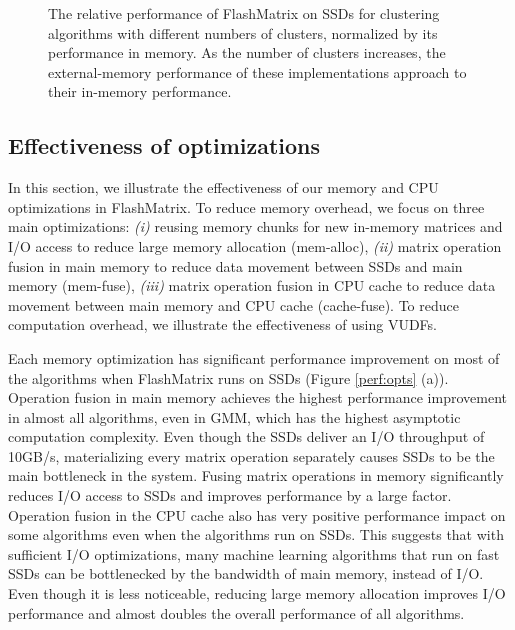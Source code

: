\begin{figure}
	\begin{center}
		\footnotesize
		\vspace{-15pt}
		
		\vspace{-10pt}
		\caption{The relative performance of FlashMatrix on SSDs for
			clustering algorithms with different numbers of clusters, normalized
			by its performance in memory. As the number of clusters increases,
			the external-memory performance of these implementations approach
			to their in-memory performance.}
		\label{perf:clust}
	\end{center}
\end{figure}

\subsection{Effectiveness of optimizations}

In this section, we illustrate the effectiveness of our memory and CPU
optimizations in FlashMatrix. To reduce memory overhead, we focus on three
main optimizations: \textit{(i)} reusing memory chunks for new in-memory
matrices and I/O access to reduce large memory allocation (mem-alloc),
\textit{(ii)} matrix operation fusion in main memory to reduce data movement
between SSDs and main memory (mem-fuse), \textit{(iii)} matrix operation
fusion in CPU cache to reduce data movement between main memory and CPU cache
(cache-fuse). To reduce computation overhead, we illustrate the effectiveness
of using VUDFs.

Each memory optimization has significant performance improvement on most of
the algorithms when FlashMatrix runs on SSDs (Figure \ref{perf:opts} (a)).
Operation fusion in main memory achieves
the highest performance improvement in almost all algorithms, even in GMM,
which has the highest asymptotic computation complexity. Even though the SSDs
deliver an I/O throughput of 10GB/s, materializing every matrix operation
separately causes SSDs to be the main bottleneck in the system.
Fusing matrix operations in memory significantly reduces I/O access to SSDs and
improves performance by a large factor. Operation fusion in the CPU cache also
has very positive performance impact on some algorithms even when
the algorithms run on SSDs. This suggests that with sufficient I/O optimizations,
many machine learning algorithms that run on fast SSDs can be bottlenecked by
the bandwidth of main memory, instead of I/O. Even though it is less noticeable,
reducing large memory allocation improves I/O performance and almost doubles
the overall performance of all algorithms.

